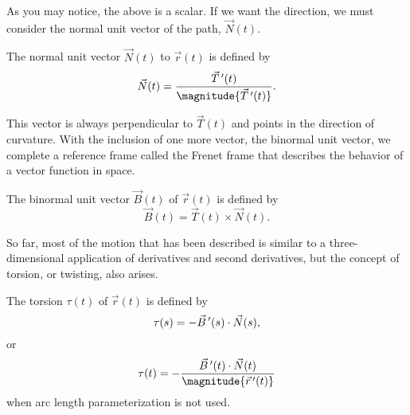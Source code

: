 As you may notice, the above is a scalar. If we want the direction, we must consider the normal unit vector of the path, $\vec{N}(t)$.

\begin{proposition}
    The normal unit vector $\vec{N}(t)$ to $\vec{r}(t)$ is defined by
    \[\vec{N}(t) = \frac{\ddvec{T}(t)}{\magnitude{\ddvec{T}(t)}}.\]
\end{proposition}

This vector is always perpendicular to $\vec{T}(t)$ and points in the direction of curvature. With the inclusion of one more vector, the binormal unit vector, we complete a reference frame called the Frenet frame that describes the behavior of a vector function in space.

\begin{proposition}
    The binormal unit vector $\vec{B}(t)$ of $\vec{r}(t)$ is defined by
    \[\vec{B}(t) = \vec{T}(t) \times \vec{N}(t).\]
\end{proposition}

So far, most of the motion that has been described is similar to a three-dimensional application of derivatives and second derivatives, but the concept of torsion, or twisting, also arises.

\begin{proposition}
    The torsion $\tau(t)$ of $\vec{r}(t)$ is defined by
    \[\tau(s) = -\vec{B}\,^{\prime}(s) \cdot \vec{N}(s),\]
    or
    \[\tau(t) = -\frac{\ddvec{B}(t) \cdot \vec{N}(t)}{\magnitude{\ddvec{r}(t)}}\]
    when arc length parameterization is not used.
\end{proposition}